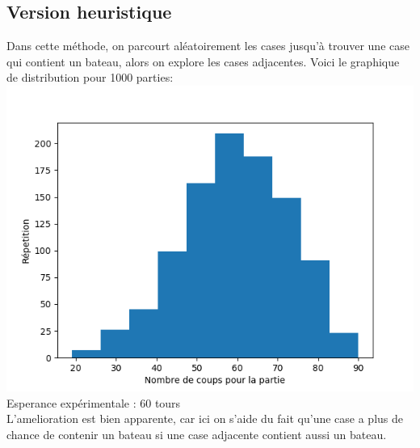 \documentclass[12pt]{article}
\begin{document}
    \subsection{Version heuristique}
    Dans cette méthode, on parcourt aléatoirement les cases jusqu'à trouver une case qui contient un bateau, alors on explore les cases adjacentes.
    Voici le graphique de distribution pour 1000 parties: \\
    \includegraphics[width=\linewidth]{Heuristique.png}            
    Esperance expérimentale : 60 tours \\
    L'amelioration est bien apparente, car ici on s'aide du fait qu'une case a plus de chance de contenir un bateau si une case adjacente contient aussi un bateau.
    
\end{document}
